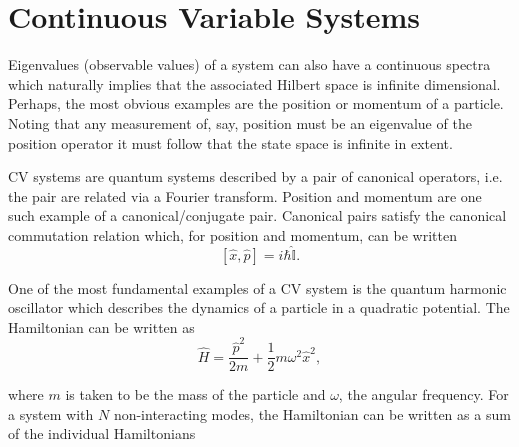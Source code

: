 \documentclass[11pt,a4paper,openbib]{article}
\numberwithin{equation}{section}
\begin{document}
\section{Continuous Variable Systems}
\label{sec:cvs}
Eigenvalues (observable values) of a system can also have a continuous spectra which naturally implies that the associated Hilbert space is infinite dimensional. Perhaps, the most obvious examples are the position or momentum of a particle. Noting that any measurement of, say, position must be an eigenvalue of the position operator it must follow that the state space is infinite in extent. 

CV systems are quantum systems described by a pair of canonical operators, i.e. the pair are related via a Fourier transform. Position and momentum are one such example of a canonical/conjugate pair. Canonical pairs satisfy the canonical commutation relation which, for position and momentum, can be written \cite{Serafini05}
\begin{equation} \label{eq:6}
[\hat{x}, \hat{p}] = i\hbar\hat{\mathbb{I}}.
\end{equation}

One of the most fundamental examples of a CV system is the quantum harmonic oscillator which describes the dynamics of a particle in a quadratic potential. The Hamiltonian can be written as \cite{Adesso14, Braunstein}
\begin{equation} \label{eq:7}
\hat{H} = \frac{\hat{p}^2}{2m} + \frac{1}{2} m\omega^2\hat{x}^2,
\end{equation}

where $m$ is taken to be the mass of the particle and $\omega$, the angular frequency. For a system with $N$ non-interacting modes, the Hamiltonian can be written as a sum of the individual Hamiltonians 
\end{document}
